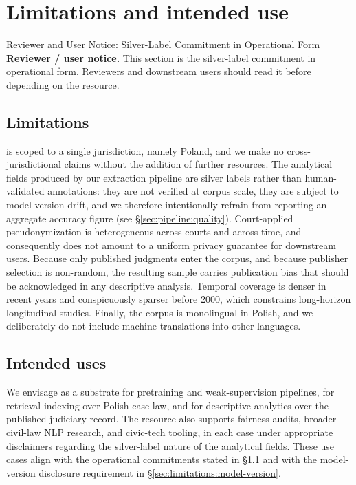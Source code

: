 
\section{Limitations and intended use}
\label{sec:limitations}

\begin{silverbox}{Reviewer and User Notice: Silver-Label Commitment in Operational Form}
\textbf{Reviewer / user notice.} This section is the silver-label commitment in operational form. Reviewers and downstream users should read it before depending on the resource.
\end{silverbox}

\subsection{Limitations}
\label{sec:limitations:limitations}

\juddgespl{} is scoped to a single jurisdiction, namely Poland, and we make no cross-jurisdictional claims without the addition of further resources. The analytical fields produced by our extraction pipeline are silver labels rather than human-validated annotations: they are not verified at corpus scale, they are subject to model-version drift, and we therefore intentionally refrain from reporting an aggregate accuracy figure (see \S\ref{sec:pipeline:quality}). Court-applied pseudonymization is heterogeneous across courts and across time, and consequently does not amount to a uniform privacy guarantee for downstream users. Because only published judgments enter the corpus, and because publisher selection is non-random, the resulting sample carries publication bias that should be acknowledged in any descriptive analysis. Temporal coverage is denser in recent years and conspicuously sparser before 2000, which constrains long-horizon longitudinal studies. Finally, the corpus is monolingual in Polish, and we deliberately do not include machine translations into other languages.

\subsection{Intended uses}
\label{sec:limitations:uses}

We envisage \juddgespl{} as a substrate for pretraining and weak-supervision pipelines, for retrieval indexing over Polish case law, and for descriptive analytics over the published judiciary record. The resource also supports fairness audits, broader civil-law NLP research, and civic-tech tooling, in each case under appropriate disclaimers regarding the silver-label nature of the analytical fields. These use cases align with the operational commitments stated in \S\ref{sec:limitations:limitations} and with the model-version disclosure requirement in \S\ref{sec:limitations:model-version}.

